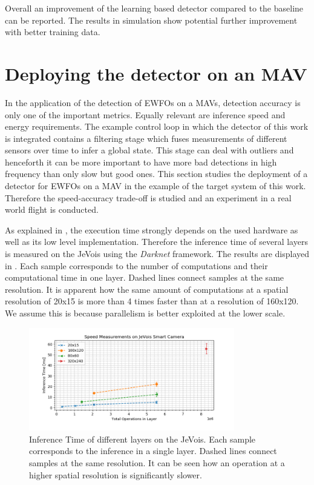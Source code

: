 Overall an improvement of the learning based detector compared to the baseline can be reported. The results in simulation show potential further improvement with better training data.


\section{Deploying the detector on an \ac{MAV}}

In the application of the detection of \acp{EWFO} on a \acp{MAV}, detection accuracy is only one of the important metrics. Equally relevant are inference speed and energy requirements. The example control loop in which the detector of this work is integrated contains a filtering stage which fuses measurements of different sensors over time to infer a global state. This stage can deal with outliers and henceforth it can be more important to have more bad detections in high frequency than only slow but good ones. This section studies the deployment of a detector for \acp{EWFO} on a \ac{MAV} in the example of the target system of this work. Therefore the speed-accuracy trade-off is studied and an experiment in a real world flight is conducted.

As explained in , the execution time strongly depends on the used hardware as well as its low level implementation. Therefore the inference time of several layers is measured on the JeVois using the \textit{Darknet} framework. The results are displayed in . Each sample corresponds to the number of computations and their computational time in one layer. Dashed lines connect samples at the same resolution. It is apparent how the same amount of computations at a spatial resolution of 20x15 is more than 4 times faster than at a resolution of 160x120. We assume this is because parallelism is better exploited at the lower scale.

\begin{figure}[hbtp]
	\centering
	\includegraphics[width=0.8\textwidth]{fig/bottleneck_jevois}
	\caption{Inference Time of different layers on the JeVois. Each sample corresponds to the inference in a single layer. Dashed lines connect samples at the same resolution. It can be seen how an operation at a higher spatial resolution is significantly slower.}
	\label{fig:bottleneck_jevois}
\end{figure}

